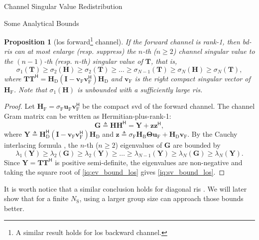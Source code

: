 \documentclass[journal]{IEEEtran}
\newtheorem{proposition}{Proposition}
\begin{document}
\begin{section}{Channel Singular Value Redistribution}
\begin{subsection}{Some Analytical Bounds}
		\begin{proposition}[\gls{los} forward\footnote{A similar result holds for \gls{los} backward channel.} channel]
			If the forward channel is rank-1, then \gls{bd}-\gls{ris} can at most enlarge (resp. suppress) the $n$-th ($n \ge 2$) channel singular value to the $(n-1)$-th (resp. $n$-th) singular value of $\mathbf{T}$, that is,
			\begin{equation}
				\sigma_1(\mathbf{T}) \ge {\sigma_2(\mathbf{H})} \ge \sigma_2(\mathbf{T}) \ge \ldots \ge \sigma_{N-1}(\mathbf{T}) \ge {\sigma_N(\mathbf{H})} \ge \sigma_N(\mathbf{T}),
				\label{iq:sv_bound_los}
			\end{equation}
			where $\mathbf{T} \mathbf{T}^\mathsf{H} = \mathbf{H}_\mathrm{D} (\mathbf{I} - \mathbf{v}_\mathrm{F} \mathbf{v}_\mathrm{F}^\mathsf{H}) \mathbf{H}_\mathrm{D}$ and $\mathbf{v}_\mathrm{F}$ is the right compact singular vector of $\mathbf{H}_\mathrm{F}$.
			Note that $\sigma_1(\mathbf{H})$ is unbounded with a sufficiently large \gls{ris}.
		\end{proposition}
		\begin{proof}
			Let $\mathbf{H}_\mathrm{F} = \sigma_\mathrm{F} \mathbf{u}_\mathrm{F} \mathbf{v}_\mathrm{F}^\mathsf{H}$ be the compact \gls{svd} of the forward channel.
			The channel Gram matrix can be written as Hermitian-plus-rank-1:
			\begin{equation}
				\mathbf{G} \triangleq \mathbf{H} \mathbf{H}^\mathsf{H} = \mathbf{Y} + \mathbf{z} \mathbf{z}^\mathsf{H},
			\end{equation}
			where $\mathbf{Y} \triangleq \mathbf{H}_\mathrm{D}^\mathsf{H} (\mathbf{I} - \mathbf{v}_\mathrm{F} \mathbf{v}_\mathrm{F}^\mathsf{H}) \mathbf{H}_\mathrm{D}$ and $\mathbf{z} \triangleq \sigma_\mathrm{F} \mathbf{H}_\mathrm{B} \mathbf{\Theta} \mathbf{u}_\mathrm{F} + \mathbf{H}_\mathrm{D} \mathbf{v}_\mathrm{F}$.
			By the Cauchy interlacing formula \cite{Golub2013}, the $n$-th ($n \ge 2$) eigenvalues of $\mathbf{G}$ are bounded by
			\begin{equation}
				\lambda_1(\mathbf{Y}) \ge \lambda_2(\mathbf{G}) \ge \lambda_2(\mathbf{Y}) \ge \ldots \ge \lambda_{N-1}(\mathbf{Y}) \ge \lambda_N(\mathbf{G}) \ge \lambda_N(\mathbf{Y}).
				\label{iq:ev_bound_los}
			\end{equation}
			Since $\mathbf{Y} = \mathbf{T} \mathbf{T}^\mathsf{H}$ is positive semi-definite, the eigenvalues are non-negative and taking the square root of \eqref{iq:ev_bound_los} gives \eqref{iq:sv_bound_los}.
		\end{proof}
		It is worth notice that a similar conclusion holds for diagonal \gls{ris} \cite{Semmler2023}.
		We will later show that for a finite $N_\mathrm{S}$, using a larger group size can approach those bounds better.


\end{subsection}
\end{section}
\end{document}
